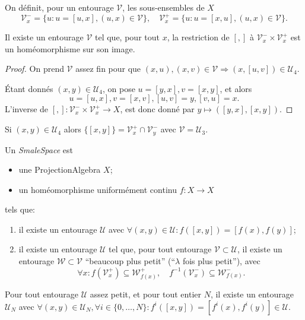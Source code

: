 \documentclass{amsart}
\begin{document}
On d\'efinit, pour un entourage $\mathcal V$, les sous-ensembles de $X$
\[\mathcal V_x^-=\{u:u=[u,x],(u,x)\in\mathcal V\},\quad\mathcal V_x^+=\{u:u=[x,u],(u,x)\in\mathcal V\}.\]
\begin{lem}
  Il existe un entourage $\mathcal V$ tel que, pour tout $x$, la restriction de $[,]$ \`a $\mathcal V_x^-\times\mathcal V_x^+$ est un hom\'eomorphisme sur son image.
\end{lem}
\begin{proof}
  On prend $\mathcal V$ assez fin pour que $(x,u),(x,v)\in\mathcal V\Rightarrow (x,[u,v])\in\mathcal U_4$.

  \'Etant donn\'es $(x,y)\in\mathcal U_4$, on pose $u=[y,x],v=[x,y]$, et alors
  \[u=[u,x],v=[x,v],[u,v]=y,[v,u]=x.\]
  L'inverse de $[,]\colon\mathcal V_x^-\times\mathcal V_x^+\to X$, est donc donn\'e par $y\mapsto([y,x],[x,y])$.
\end{proof}
\begin{cor}
  Si $(x,y)\in\mathcal U_4$ alors $\{[x,y]\}=\mathcal V_x^+\cap\mathcal V_y^-$ avec $\mathcal V=\mathcal U_3$.
\end{cor}

\begin{defn}
  Un \emph{SmaleSpace} est
  \begin{itemize}
  \item une ProjectionAlgebra $X$;
  \item un hom\'eomorphisme uniform\'ement continu $f\colon X\to X$
  \end{itemize}
  tels que:
  \begin{enumerate}
  \item il existe un entourage $\mathcal U$ avec $\forall(x,y)\in\mathcal U:f([x,y])=[f(x),f(y)]$;
  \item il existe un entourage $\mathcal U$ tel que, pour tout entourage $\mathcal V\subset\mathcal U$, il existe un entourage $\mathcal W\subset\mathcal V$ ``beaucoup plus petit'' (``$\lambda$ fois plus petit''), avec
    \[\forall x:f(\mathcal V_x^+)\subseteq \mathcal W_{f(x)}^+,\quad f^{-1}(\mathcal V_x^-)\subseteq\mathcal W_{f(x)}^-.\]
  \end{enumerate}
\end{defn}

\begin{lem}
  Pour tout entourage $\mathcal U$ assez petit, et pour tout entier $N$, il existe un entourage $\mathcal U_N$ avec $\forall(x,y)\in\mathcal U_N,\forall i\in\{0,\dots,N\}:f^i([x,y])=[f^i(x),f^i(y)]\in\mathcal U$.
\end{lem}
\end{document}
